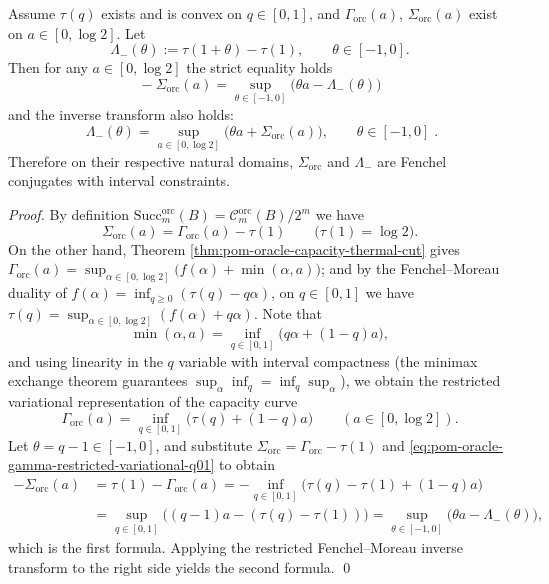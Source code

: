 \begin{theorem}\label{thm:pom-oracle-restricted-fenchel-duality-negative-temp}
Assume \(\tau(q)\) exists and is convex on \(q\in[0,1]\), and \(\Gamma_{\mathrm{orc}}(a)\), \(\Sigma_{\mathrm{orc}}(a)\) exist on \(a\in[0,\log 2]\).
Let
\[
\Lambda_{-}(\theta):=\tau(1+\theta)-\tau(1),\qquad \theta\in[-1,0].
\]
Then for any \(a\in[0,\log 2]\) the strict equality holds
\[
\boxed{\;
-\Sigma_{\mathrm{orc}}(a)=\sup_{\theta\in[-1,0]}\bigl(\theta a-\Lambda_{-}(\theta)\bigr)\;}
\]
and the inverse transform also holds:
\[
\boxed{\;
\Lambda_{-}(\theta)=\sup_{a\in[0,\log 2]}\bigl(\theta a+\Sigma_{\mathrm{orc}}(a)\bigr),\qquad \theta\in[-1,0]\; }.
\]
Therefore on their respective natural domains, \(\Sigma_{\mathrm{orc}}\) and \(\Lambda_{-}\) are Fenchel conjugates with interval constraints.
\end{theorem}
\begin{proof}
By definition \(\mathrm{Succ}^{\mathrm{orc}}_m(B)=\mathcal{C}^{\mathrm{orc}}_m(B)/2^m\) we have
\[
\Sigma_{\mathrm{orc}}(a)=\Gamma_{\mathrm{orc}}(a)-\tau(1)\qquad\bigl(\tau(1)=\log 2\bigr).
\]
On the other hand, Theorem \ref{thm:pom-oracle-capacity-thermal-cut} gives
\(
\Gamma_{\mathrm{orc}}(a)=\sup_{\alpha\in[0,\log 2]}\bigl(f(\alpha)+\min(\alpha,a)\bigr)
\);
and by the Fenchel--Moreau duality of \(f(\alpha)=\inf_{q\ge 0}(\tau(q)-q\alpha)\), on \(q\in[0,1]\) we have
\(
\tau(q)=\sup_{\alpha\in[0,\log 2]}(f(\alpha)+q\alpha)
\).
Note that
\[
\min(\alpha,a)=\inf_{q\in[0,1]}\bigl(q\alpha+(1-q)a\bigr),
\]
and using linearity in the \(q\) variable with interval compactness (the minimax exchange theorem guarantees \(\sup_\alpha\inf_q=\inf_q\sup_\alpha\)), we obtain the restricted variational representation of the capacity curve
\begin{equation}\label{eq:pom-oracle-gamma-restricted-variational-q01}
\boxed{\;
\Gamma_{\mathrm{orc}}(a)=\inf_{q\in[0,1]}\bigl(\tau(q)+(1-q)a\bigr)\qquad(a\in[0,\log 2]).\;}
\end{equation}
Let \(\theta=q-1\in[-1,0]\), and substitute \(\Sigma_{\mathrm{orc}}=\Gamma_{\mathrm{orc}}-\tau(1)\) and \eqref{eq:pom-oracle-gamma-restricted-variational-q01} to obtain
\[
\begin{aligned}
-\Sigma_{\mathrm{orc}}(a)
&=\tau(1)-\Gamma_{\mathrm{orc}}(a)
=-\inf_{q\in[0,1]}\bigl(\tau(q)-\tau(1)+(1-q)a\bigr)\\
&=\sup_{q\in[0,1]}\bigl((q-1)a-(\tau(q)-\tau(1))\bigr)
=\sup_{\theta\in[-1,0]}\bigl(\theta a-\Lambda_{-}(\theta)\bigr),
\end{aligned}
\]
which is the first formula.
Applying the restricted Fenchel--Moreau inverse transform to the right side yields the second formula. \qed
\end{proof}

